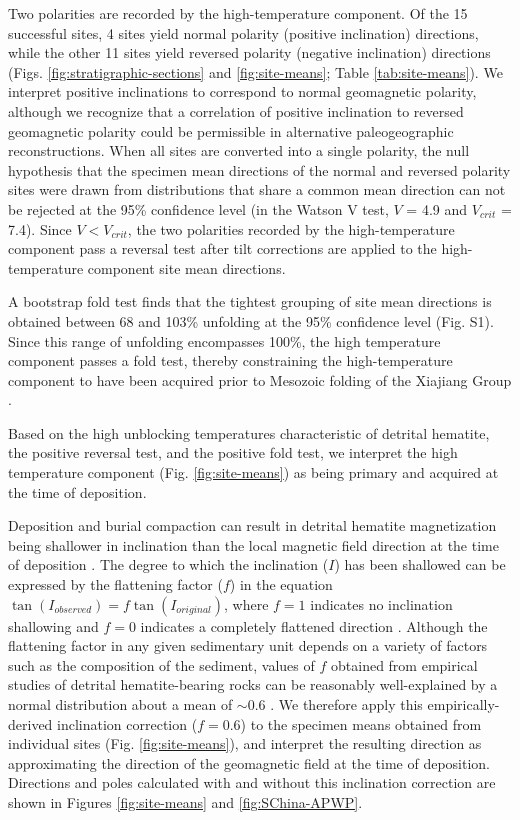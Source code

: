 Two polarities are recorded by the high-temperature component. Of the 15 successful sites, 4 sites yield normal polarity (positive inclination) directions, while the other 11 sites yield reversed polarity (negative inclination) directions (Figs. \ref{fig:stratigraphic-sections} and \ref{fig:site-means}; Table \ref{tab:site-means}). We interpret positive inclinations to correspond to normal geomagnetic polarity, although we recognize that a correlation of positive inclination to reversed geomagnetic polarity could be permissible in alternative paleogeographic reconstructions. When all sites are converted into a single polarity, the null hypothesis that the specimen mean directions of the normal and reversed polarity sites were drawn from distributions that share a common mean direction can not be rejected at the 95\% confidence level (in the Watson V test, $V$ = 4.9 and $V_{crit}$ = 7.4). Since $V<V_{crit}$, the two polarities recorded by the high-temperature component pass a reversal test after tilt corrections are applied to the high-temperature component site mean directions.

A bootstrap fold test \citep{Tauxe1994a} finds that the tightest grouping of site mean directions is obtained between 68 and 103\% unfolding at the 95\% confidence level (Fig. S1). Since this range of unfolding encompasses 100\%, the high temperature component passes a fold test, thereby constraining the high-temperature component to have been acquired prior to Mesozoic folding of the Xiajiang Group \citep{Li2016c, Ma2019a}.

Based on the high unblocking temperatures characteristic of detrital hematite, the positive reversal test, and the positive fold test, we interpret the high temperature component (Fig. \ref{fig:site-means}) as being primary and acquired at the time of deposition.

Deposition and burial compaction can result in detrital hematite magnetization being shallower in inclination than the local magnetic field direction at the time of deposition \citep{Tauxe2005a, Bilardello2016a}. The degree to which the inclination ($I$) has been shallowed can be expressed by the flattening factor ($f$) in the equation $\tan(I_{observed}) = f\tan(I_{original})$, where $f=1$ indicates no inclination shallowing and $f=0$ indicates a completely flattened direction \citep{King1955a}. Although the flattening factor in any given sedimentary unit depends on a variety of factors such as the composition of the sediment, values of $f$ obtained from empirical studies of detrital hematite-bearing rocks can be reasonably well-explained by a normal distribution about a mean of $\sim$0.6 \citep{Tauxe1984a, Bilardello2016a}. We therefore apply this empirically-derived inclination correction ($f=0.6$) to the specimen means obtained from individual sites (Fig. \ref{fig:site-means}), and interpret the resulting direction as approximating the direction of the geomagnetic field at the time of deposition. Directions and poles calculated with and without this inclination correction are shown in Figures \ref{fig:site-means} and \ref{fig:SChina-APWP}.


